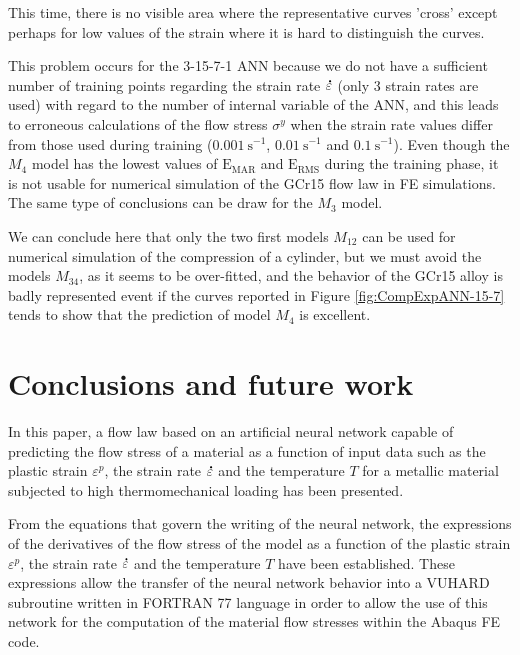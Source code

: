 \documentclass[algorithms,article,submit,pdftex,moreauthors]{Definitions/mdpi}
\DeclareRobustCommand{\mdot}[1]{\accentset{\mbox{\bfseries .}}{#1}}
\DeclareRobustCommand{\RMSE}{\text{E}_\text{RMS}}
\DeclareRobustCommand{\MARE}{\text{E}_\text{MAR}}
\DeclareRobustCommand{\ps}{\text{s}^{-1}}
\begin{document}
This time, there is no visible area where the representative curves 'cross' except perhaps for low values of the strain where it is hard to distinguish the curves.

This problem occurs for the 3-15-7-1 ANN because we do not have a sufficient number of training points regarding the strain rate $\mdot\varepsilon$ (only 3 strain rates are used) with regard to the number of internal variable of the ANN, and this leads to erroneous calculations of the flow stress $\sigma^y$ when the strain rate values differ from those used during training ($0.001~\ps$, $0.01~\ps$ and $0.1~\ps$).
Even though the $M_4$ model has the lowest values of $\MARE$ and $\RMSE$ during the training phase, it is not usable for numerical simulation of the GCr15 flow law in FE simulations. The same type of conclusions can be draw for the $M_3$ model.

We can conclude here that only the two first models $M_{12}$ can be used for numerical simulation of the compression of a cylinder, but we must avoid the models $M_{34}$, as it seems to be over-fitted, and the behavior of the GCr15 alloy is badly represented event if the curves reported in Figure \ref{fig:CompExpANN-15-7} tends to show that the prediction of model $M_4$ is excellent.

\section{Conclusions and future work}\label{sec:Conclusions}

In this paper, a flow law based on an artificial neural network capable of predicting the flow stress of a material as a function of input data such as the plastic strain $\varepsilon^p$, the strain rate $\mdot\varepsilon$ and the temperature $T$ for a metallic material subjected to high thermomechanical loading has been presented.

From the equations that govern the writing of the neural network, the expressions of the derivatives of the flow stress of the model as a function of the plastic strain $\varepsilon^p$, the strain rate $\mdot\varepsilon$ and the temperature $T$ have been established.
These expressions allow the transfer of the neural network behavior into a VUHARD subroutine written in FORTRAN 77 language in order to allow the use of this network for the computation of the material flow stresses within the Abaqus FE code.
\end{document}
